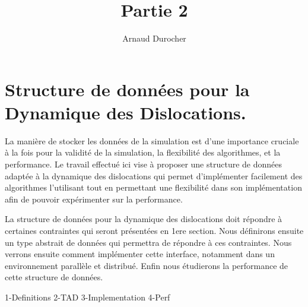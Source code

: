 \documentclass[11pt,class=article,float=false,crop=false]{standalone}
\title{ Partie 2 }
\author{Arnaud Durocher}
\begin{document}
	
\onlyifstandalone{\maketitle}
\onlyifstandalone{\tableofcontents}
\onlyifstandalone{\listoftodos}

\part{Structure de données pour la Dynamique des Dislocations.}

La manière de stocker les données de la simulation est d'une importance cruciale à la fois pour la validité de la simulation, la flexibilité des algorithmes, et la performance. Le travail effectué ici vise à proposer une structure de données adaptée à la dynamique des dislocations qui permet d'implémenter facilement des algorithmes l'utilisant tout en permettant une flexibilité dans son implémentation afin de pouvoir expérimenter sur la performance.

La structure de données pour la dynamique des dislocations doit répondre à certaines contraintes qui seront présentées en 1ere section. Nous définirons ensuite un type abstrait de données qui permettra de répondre à ces contraintes. Nous verrons ensuite comment implémenter cette interface, notamment dans un environnement parallèle et distribué. Enfin nous étudierons la performance de cette structure de données.

{1-Definitions}
{2-TAD}
{3-Implementation}
{4-Perf}



\end{document}
